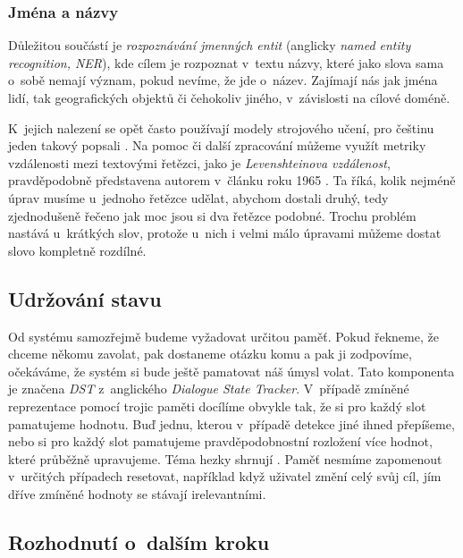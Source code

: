 \subsubsection{Jména a názvy}
Důležitou součástí je \textit{rozpoznávání jmenných entit} (anglicky
\textit{named entity recognition, NER}),
kde cílem je rozpoznat v~textu názvy, které jako slova sama o~sobě nemají
význam, pokud nevíme, že jde o~název. Zajímají nás jak jména lidí, tak
geografických objektů či čehokoliv jiného, v~závislosti na cílové doméně.

K~jejich nalezení se opět často používají modely strojového učení, pro češtinu
jeden takový popsali \citet{ekstein_czech_2019}. Na pomoc či další zpracování
můžeme využít metriky vzdálenosti mezi textovými řetězci,
jako je \textit{Levenshteinova vzdálenost}, pravděpodobně představena autorem
v~článku roku 1965 \citep{Levenshtein1965BinaryCC}. Ta říká, kolik nejméně úprav
musíme u~jednoho řetězce udělat, abychom dostali druhý, tedy zjednodušeně řečeno
jak moc jsou si dva řetězce podobné. Trochu problém nastává u~krátkých slov,
protože u~nich i velmi málo úpravami můžeme dostat slovo kompletně rozdílné.

\subsection{Udržování stavu}\label{dst}

Od systému samozřejmě budeme vyžadovat určitou paměť. Pokud řekneme, že
chceme někomu zavolat, pak dostaneme otázku komu a pak ji zodpovíme, očekáváme,
že systém si bude ještě pamatovat náš úmysl volat. Tato komponenta je
značena \textit{DST} z~anglického \textit{Dialogue State Tracker}. V~případě
zmíněné reprezentace pomocí trojic paměti docílíme obvykle tak, že si pro každý
slot pamatujeme hodnotu. Buď jednu, kterou v~případě detekce jiné ihned přepíšeme,
nebo si pro každý slot pamatujeme pravděpodobnostní rozložení více hodnot, které
průběžně upravujeme. Téma hezky shrnují \citet{williams_dialog_2016}.
Paměť nesmíme zapomenout v~určitých případech
resetovat, například když uživatel změní celý svůj cíl, jím dříve
zmíněné hodnoty se stávají irelevantními.

\subsection{Rozhodnutí o~dalším kroku}\label{dp}

